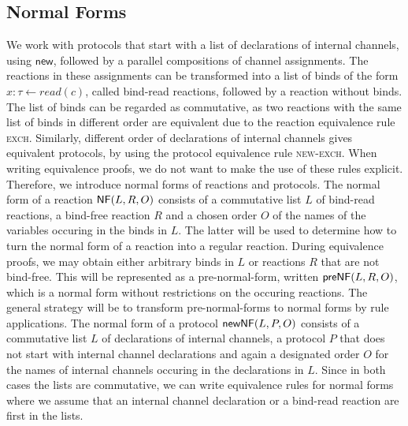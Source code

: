 \subsection{Normal Forms}
We work with protocols that start with a list of declarations of 
internal channels, using $\mathsf{new}$, followed by a parallel compositions of channel assignments. The reactions in these
assignments can be transformed into a list of binds of the form
$x : \tau \leftarrow read(c)$, called
bind-read reactions, followed by a reaction without binds.
The list of binds can be regarded as commutative, 
as two reactions with the same list of binds in different order
are equivalent due to the reaction equivalence rule \textsc{exch}.
Similarly, different order of declarations of internal channels gives
equivalent protocols, by using the protocol equivalence rule
\textsc{new-exch}. When writing equivalence proofs, we do not want to 
make the use of these rules explicit. Therefore, we introduce
normal forms of reactions and protocols. The normal form of
a reaction 
$\mathsf{NF}(L, R, O)$
consists of a commutative list $L$ of bind-read reactions,
a bind-free reaction $R$ 
and a chosen order $O$ of the names of the variables occuring in
the binds in $L$.
The latter will be used to determine how to turn the normal form 
of a reaction into a regular reaction. 
During equivalence proofs, we may obtain either arbitrary binds in
$L$ or reactions $R$ that are not bind-free.
This will be represented as a pre-normal-form, 
written $\mathsf{preNF}(L, R, O)$, which is a normal
form without restrictions on the occuring reactions. The general
strategy will be to transform pre-normal-forms to normal 
forms by rule applications.
The normal form of a 
protocol 
$\mathsf{newNF}(L, P, O)$
consists of a commutative list $L$ of declarations of internal
channels, a protocol $P$ that does not start with internal channel declarations
and again a designated order $O$ 
for the names of internal channels occuring in the declarations in $L$.
Since in both cases the lists are commutative, we can write
equivalence rules for normal forms where we assume that an
internal channel declaration or a bind-read reaction are first in the 
lists.